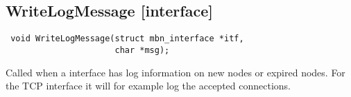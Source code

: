 \subsection{WriteLogMessage \footnotesize{[interface]}}
\begin{verbatim}
 void WriteLogMessage(struct mbn_interface *itf,
                      char *msg);
\end{verbatim}
Called when a interface has log information on new nodes or expired nodes. For the TCP interface it will for example log the accepted connections.

